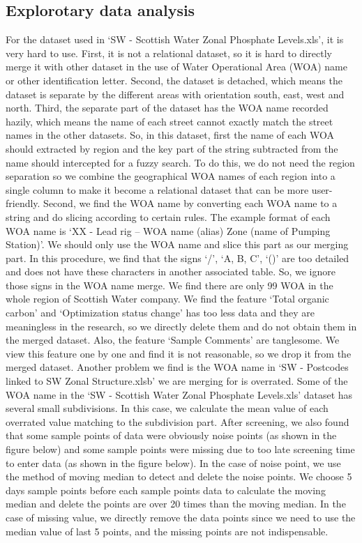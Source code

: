 \documentclass[11pt,twoside]{article}
\numberwithin{Theorem}{section}
\numberwithin{Definition}{section}
\numberwithin{Lemma}{section}
\numberwithin{Algorithm}{section}
\numberwithin{equation}{section}
\begin{document}
\clearpage

\subsection{Explorotary data analysis}
For the dataset used in `SW - Scottish Water Zonal Phosphate Levels.xls', it is very hard to use. First, it is not a relational dataset, so it is hard to directly merge it with other dataset in the use of Water Operational Area (WOA) name or other identification letter. Second, the dataset is detached, which means the dataset is separate by the different areas with orientation south, east, west and north. Third, the separate part of the dataset has the WOA name recorded hazily, which means the name of each street cannot exactly match the street names in the other datasets. So, in this dataset, first the name of each WOA should extracted by region and the key part of the string subtracted from the name should intercepted for a fuzzy search. To do this, we do not need the region separation so we combine the geographical WOA names of each region into a single column to make it become a relational dataset that can be more user-friendly. Second, we find the WOA name by converting each WOA name to a string and do slicing according to certain rules. The example format of each WOA name is `XX - Lead rig – WOA name (alias) Zone (name of Pumping Station)'. We should only use the WOA name and slice this part as our merging part. In this procedure, we find that the signs `/', `A, B, C', `()' are too detailed and does not have these characters in another associated table. So, we ignore those signs in the WOA name merge. We find there are only 99 WOA in the whole region of Scottish Water company. We find the feature `Total organic carbon' and `Optimization status change' has too less data and they are meaningless in the research, so we directly delete them and do not obtain them in the merged dataset. Also, the feature `Sample Comments' are tanglesome. We view this feature one by one and find it is not reasonable, so we drop it from the merged dataset. Another problem we find is the WOA name in `SW - Postcodes linked to SW Zonal Structure.xlsb' we are merging for is overrated. Some of the WOA name in the `SW - Scottish Water Zonal Phosphate Levels.xls' dataset has several small subdivisions. In this case, we calculate the mean value of each overrated value matching to the subdivision part. After screening, we also found that some sample points of data were obviously noise points (as shown in the figure below) and some sample points were missing due to too late screening time to enter data (as shown in the figure below). In the case of noise point, we use the method of moving median to detect and delete the noise points. We choose 5 days sample points before each sample points data to calculate the moving median and delete the points are over 20 times than the moving median. In the case of missing value, we directly remove the data points since we need to use the median value of last 5 points, and the missing points are not indispensable.
\end{document}
